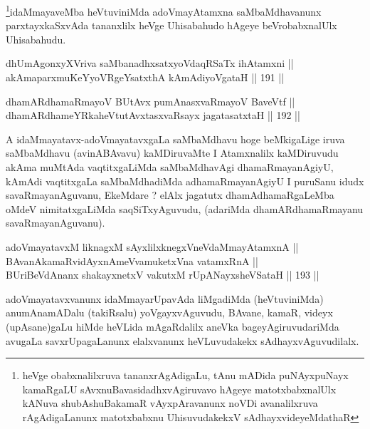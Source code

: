 \begin{artha}
\footnote{heVge obabxnalilxruva tananxrAgAdigaLu, tAnu mADida
puNAyxpuNayx kamaRgaLU sAvxnuBavasidadhxvAgiruvavo hAgeye
matotxbabxnalUlx kANuva shubAshuBakamaR vAyxpAravanunx noVDi
avanalilxruva rAgAdigaLanunx matotxbabxnu UhisuvudakekxV sAdhayxvideyeMdathaR}idaMmayaveMba heVtuviniMda adoVmayAtamxna saMbaMdhavanunx parxtayxkaSxvAda tananxlilx heVge Uhisabahudo hAgeye beVrobabxnalUlx Uhisabahudu.
\end{artha}


\begin{shl}
dhUmAgonxyXVriva saMbanadhxsatxyoVdaqRSaTx ihA\s \s tamxni || \\
\footnotemark[1]akAmaparxmuKeYyoVRgeYsatxthA kAmAdiyoVgataH \hfill || 191 || 
\end{shl}

\begin{shl}
dhamARdhamaRmayoV BUtAvx pumAnasxvaRmayoV BaveVtf || \\
dhamARdhameYRkaheVtutAvxtasxvaRsayx jagatasatxtaH \hfill || 192 ||  
\end{shl}

\begin{artha}
A idaMmayatavx-adoVmayatavxgaLa saMbaMdhavu hoge
beMkigaLige iruva saMbaMdhavu (avinABAvavu) kaMDiruvaMte I Atamxnalilx
kaMDiruvudu akAma muMtAda vaqtitxgaLiMda  saMbaMdhavAgi
dhamaRmayanAgiyU, kAmAdi vaqtitxgaLa saMbaMdhadiMda adhamaRmayanAgiyU
I puruSanu idudx savaRmayanAguvanu, EkeMdare ? elAlx jagatutx
dhamAdhamaRgaLeMba oMdeV nimitatxgaLiMda saqSiTxyAguvudu, (adariMda
dhamARdhamaRmayanu savaRmayanAguvanu).
\end{artha}


\begin{shl}
\footnotemark[2]adoVmayatavxM liknagxM sAyxlilxknegxVneVdaMmayAtamxnA || \\
BAvanAkamaRvidAyxnAmeVvamuketxVna vatamxRnA || \\
BUriBeVdAnanx shakayxnetxV vakutxM rUpANayxsheVSataH \hfill || 193 ||  
\end{shl}

\begin{artha}
adoVmayatavxvanunx idaMmayarUpavAda liMgadiMda
(heVtuviniMda) anumAnamADalu (takiRsalu) yoVgayxvAguvudu, BAvane,
kamaR, videyx (upAsane)gaLu hiMde heVLida mAgaRdalilx aneVka
bageyAgiruvudariMda avugaLa savxrUpagaLanunx elalxvanunx heVLuvudakekx
sAdhayxvAguvudilalx.
\end{artha}

